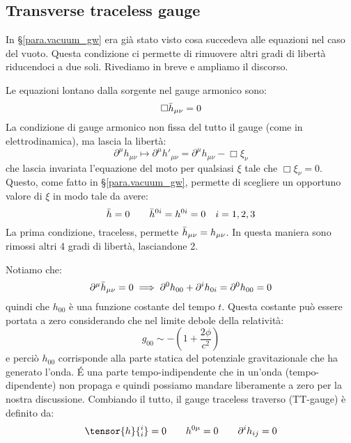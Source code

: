 \subsection{Transverse traceless gauge}
In \S\ref{para.vacuum_gw} era già stato visto cosa succedeva alle equazioni nel caso del vuoto. Questa condizione ci permette di rimuovere altri gradi di libertà riducendoci a due soli.  Rivediamo in breve e ampliamo il discorso.

Le equazioni lontano dalla sorgente nel gauge armonico sono:
\begin{equation*}
    \Box\Bar{h}_{\mu\nu} = 0
\end{equation*}
La condizione di gauge armonico non fissa del tutto il gauge (come in elettrodinamica), ma lascia la libertà:
\begin{equation*}
    \partial^\mu h_{\mu\nu} \mapsto \partial^\mu h'_{\mu\nu} = \partial^\mu h_{\mu\nu} - \Box \xi_\nu
\end{equation*}
che lascia invariata l'equazione del moto per qualsiasi $\xi$ tale che $\Box\xi_\nu=0$. Questo, come fatto in \S\ref{para.vacuum_gw}, permette di scegliere un opportuno valore di $\xi$ in modo tale da avere:
\begin{equation*}
    \Bar{h}=0 \qquad \Bar{h}^{0i} = h^{0i}=0 \quad i=1,2,3
\end{equation*}
La prima condizione, traceless, permette $\Bar{h}_{\mu\nu}=h_{\mu\nu}$. In questa maniera sono rimossi altri 4 gradi di libertà, lasciandone 2.

Notiamo che:
\begin{equation*}
    \partial^\mu \Bar{h}_{\mu\nu} = 0 \implies \partial^0 h_{00} + \partial^i h_{0i}= \partial^0 h_{00} =0
\end{equation*}
quindi che $h_{00}$ è una funzione costante del tempo $t$. Questa costante può essere portata a zero considerando che nel limite debole della relatività:
\begin{equation*}
    g_{00}\sim - \left( 1 + \frac{2\phi}{c^2}\right)
\end{equation*}
e perciò $h_{00}$ corrisponde alla parte statica del potenziale gravitazionale che ha generato l'onda. \'E una parte tempo-indipendente che in un'onda (tempo-dipendente) non propaga e quindi possiamo mandare liberamente a zero per la nostra discussione. Combiando il tutto, il gauge traceless traverso (TT-gauge) è definito da:
\begin{equation}
    \tensor{h}{^i_i}=0 \qquad h^{0\mu}=0 \qquad \partial^i h_{ij} = 0
    \label{eq.tt_gauge}
\end{equation}

